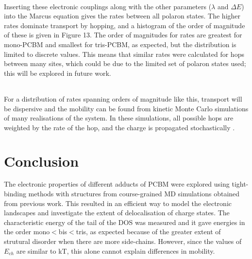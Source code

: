 \documentclass[a4paper,12pt]{article}
\begin{document}
\\

 \noindent Inserting these electronic couplings along with the other parameters ($\lambda$ and $\Delta E$) into the Marcus equation gives the rates between all polaron states. The higher rates dominate transport by hopping, and a histogram of the order of magnitude of these is given in Figure 13. The order of magnitudes for rates are greatest for mono-PCBM and smallest for tris-PCBM, as expected, but the distribution is limited to discrete values. This means that similar rates were calculated for hops between many sites, which could be due to the limited set of polaron states used; this will be explored in future work.       

\\     

\noindent For a distribution of rates spanning orders of magnitude like this, transport will be dispersive and the mobility can be found from kinetic Monte Carlo simulations of many realisations of the system. In these simulations, all possible hops are weighted by the rate of the hop, and the charge is propagated stochastically \cite{Nelson2009}.  

\section{Conclusion}

\noindent The electronic properties of different adducts of PCBM were explored using tight-binding methods with structures from course-grained MD simulations obtained from previous work. This resulted in an efficient way to model the electronic landscapes and investigate the extent of delocalisation of charge states. The characteristic energy of the tail of the DOS was measured and it gave energies in the order mono$<$bis$<$tris, as expected because of the greater extent of strutural disorder when there are more side-chains. However, since the values of $E_{ch}$ are similar to kT, this alone cannot explain differences in mobility.\\
\end{document}
